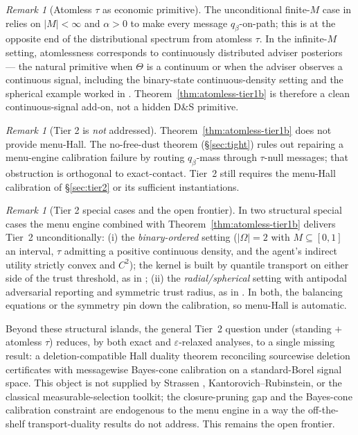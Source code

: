 \documentclass[11pt]{article}
\theoremstyle{definition}
\theoremstyle{remark}
\newtheorem{remark}[theorem]{Remark}
\newcommand{\eps}{\varepsilon}
\newcommand{\Om}{\Omega}
\begin{document}
\begin{remark}[Atomless $\tau$ as economic primitive]
The unconditional finite-$M$ case in
\cite{DworczakSmolin2026} relies on $|M|<\infty$ and $\alpha>0$ to
make every message $q_\beta$-on-path; this is at the opposite end of
the distributional spectrum from atomless $\tau$. In the infinite-$M$
setting, atomlessness corresponds to continuously distributed adviser
posteriors --- the natural primitive when $\Theta$ is a continuum or
when the adviser observes a continuous signal, including the
binary-state continuous-density setting and the spherical example
worked in \cite{DworczakSmolin2026}. Theorem~\ref{thm:atomless-tier1b}
is therefore a clean continuous-signal add-on, not a hidden D\&S
primitive.
\end{remark}

\begin{remark}[Tier 2 is \emph{not} addressed]
Theorem~\ref{thm:atomless-tier1b} does not provide menu-Hall. The
no-free-dust theorem (\S\ref{sec:tight}) rules out repairing a
menu-engine calibration failure by routing $q_\beta$-mass through
$\tau$-null messages; that obstruction is orthogonal to exact-contact.
Tier~2 still requires the menu-Hall calibration of \S\ref{sec:tier2}
or its sufficient instantiations.
\end{remark}

\begin{remark}[Tier 2 special cases and the open frontier]
In two structural special cases the menu engine combined with
Theorem~\ref{thm:atomless-tier1b} delivers Tier~2 unconditionally:
(i) the \emph{binary-ordered} setting ($|\Om|=2$ with $M\subseteq[0,1]$
an interval, $\tau$ admitting a positive continuous density, and the
agent's indirect utility strictly convex and $C^2$); the kernel is
built by quantile transport on either side of the trust threshold, as
in \cite[Prop.~1]{DworczakSmolin2026};
(ii) the \emph{radial/spherical} setting with antipodal adversarial
reporting and symmetric trust radius, as in
\cite[\S5.2, Appendix A.10]{DworczakSmolin2026}. In both, the
balancing equations or the symmetry pin down the calibration, so
menu-Hall is automatic.

Beyond these structural islands, the general Tier~2 question under
(standing $+$ atomless $\tau$) reduces, by both exact and
$\eps$-relaxed analyses, to a single missing result: a
deletion-compatible Hall duality theorem reconciling sourcewise
deletion certificates with messagewise Bayes-cone calibration on a
standard-Borel signal space. This object is not supplied by
Strassen \cite{Strassen1965}, Kantorovich--Rubinstein, or the
classical measurable-selection toolkit; the closure-pruning gap and
the Bayes-cone calibration constraint are endogenous to the menu
engine in a way the off-the-shelf transport-duality results do not
address. This remains the open frontier.
\end{remark}
\end{document}
